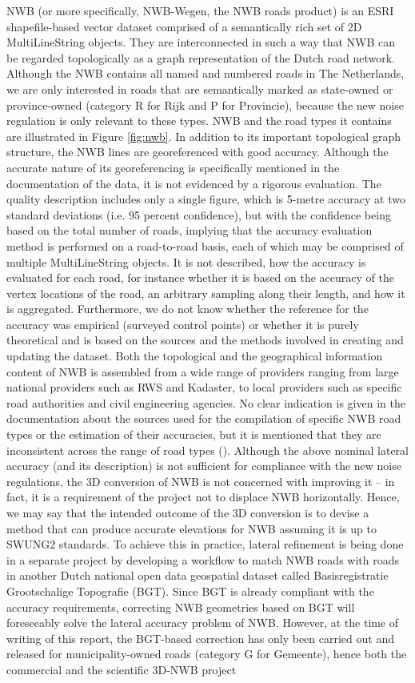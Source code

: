 NWB (or more specifically, NWB-Wegen, the NWB roads product) is an ESRI shapefile-based vector dataset comprised of a semantically rich set of 2D MultiLineString objects. They are interconnected in such a way that NWB can be regarded topologically as a graph representation of the Dutch road network. Although the NWB contains all named and numbered roads in The Netherlands, we are only interested in roads that are semantically marked as state-owned or province-owned (category R for Rijk and P for Provincie), because the new noise regulation is only relevant to these types. NWB and the road types it contains are illustrated in Figure \ref{fig:nwb}. In addition to its important topological graph structure, the NWB lines are georeferenced with good accuracy. Although the accurate nature of its georeferencing is specifically mentioned in the documentation of the data, it is not evidenced by a rigorous evaluation. The quality description includes only a single figure, which is 5-metre accuracy at two standard deviations (i.e. 95 percent confidence), but with the confidence being based on the total number of roads, implying that the accuracy evaluation method is performed on a road-to-road basis, each of which may be comprised of multiple MultiLineString objects. It is not described, how the accuracy is evaluated for each road, for instance whether it is based on the accuracy of the vertex locations of the road, an arbitrary sampling along their length, and how it is aggregated. Furthermore, we do not know whether the reference for the accuracy was empirical (surveyed control points) or whether it is purely theoretical and is based on the sources and the methods involved in creating  and updating the dataset. Both the topological and the geographical information content of NWB is assembled from a wide range of providers ranging from large national providers such as RWS and Kadaster, to local providers such as specific road authorities and civil engineering agencies. No clear indication is given in the documentation about the sources used for the compilation of specific NWB road types or the estimation of their accuracies, but it is mentioned that they are inconsistent across the range of road types (\cite{nwb_docs}). Although the above nominal lateral accuracy (and its description) is not sufficient for compliance with the new noise regulations, the 3D conversion of NWB is not concerned with improving it – in fact, it is a requirement of the project not to displace NWB horizontally. Hence, we may say that the intended outcome of the 3D conversion is to devise a method that can produce accurate elevations for NWB assuming it  is up to SWUNG2 standards. To achieve this in practice, lateral refinement is being done in a separate project by developing a workflow to match NWB roads with roads in another Dutch national open data geospatial dataset called Basisregistratie Grootschalige Topografie (BGT). Since BGT is already compliant with the accuracy requirements, correcting NWB geometries based on BGT will foreseeably solve the lateral accuracy problem of NWB. However, at the time of writing of this report, the BGT-based correction has only been carried out and released for municipality-owned roads (category G for Gemeente), hence both the commercial and the scientific 3D-NWB project 